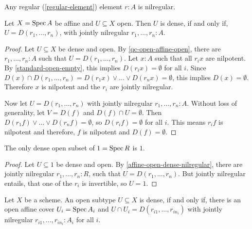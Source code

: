 \begin{proposition}
  Any regular (\cref{regular-element}) element $r:A$ is nilregular.
\end{proposition}

\begin{lemma}%
  \label{affine-open-dense-nilregular}
  Let $X=\operatorname{Spec} A$ be affine and $U\subseteq X$ open.
  Then $U$ is dense, if and only if,
  $U=D(r_1,\dots,r_n)$, with jointly nilregular $r_1,\dots,r_n:A$.
\end{lemma}

\begin{proof}
  Let $U\subseteq X$ be dense and open.
  By \cref{qc-open-affine-open}, there are $r_1,\dots,r_n:A$ such that $U=D(r_1,\dots,r_n)$.
  Let $x:A$ such that all $r_ix$ are nilpotent.
  By \cref{standard-open-empty}, this implies $D(r_ix)=\emptyset$ for all $i$.
  Since $D(x)\cap D(r_1,\dots,r_n)=D(r_1x)\vee\dots\vee D(r_nx)=\emptyset$,
  this implies $D(x)=\emptyset$.
  Therefore $x$ is nilpotent and the $r_i$ are jointly nilregular.

  Now let $U=D(r_1,\dots,r_n)$ with jointly nilregular $r_1,\dots,r_n:A$.
  Without loss of generality, let $V=D(f)$ and $D(f)\cap U=\emptyset$.
  Then $D(r_1f)\vee \dots \vee D(r_nf)=\emptyset$, so $D(r_if)=\emptyset$ for all $i$.
  This means $r_if$ is nilpotent and therefore, $f$ is nilpotent and $D(f)=\emptyset$.
\end{proof}

\begin{corollary}%
  The only dense open subset of $1=\operatorname{Spec} R$ is $1$.
\end{corollary}

\begin{proof}
  Let $U\subseteq 1$ be dense and open.
  By \cref{affine-open-dense-nilregular},
  there are jointly nilregular $r_1,\dots,r_n:R$,
  such that $U=D(r_1,\dots,r_n)$.
  But jointly nilregular entails,
  that one of the $r_i$ is invertible, so $U=1$.
\end{proof}

\begin{theorem}%
  \label{dense-is-jointly-nilregular}
  Let $X$ be a scheme.
  An open subtype $U\subseteq X$ is dense,
  if and only if, there is an open affine cover $U_i=\operatorname{Spec} A_i$
  and $U\cap U_i=D(r_{i1},\dots,r_{in_i})$ with jointly nilregular $r_{i1},\dots,r_{in_i}:A_i$ for all $i$.
\end{theorem}


